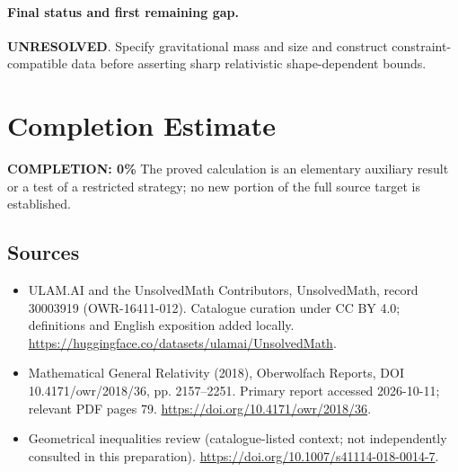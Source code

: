 \documentclass[11pt]{article}
\begin{document}
\paragraph{Final status and first remaining gap.}
\textbf{UNRESOLVED}. Specify gravitational mass and size and construct constraint-compatible data before asserting sharp relativistic shape-dependent bounds.

\section{Completion Estimate}
\noindent\textbf{COMPLETION: 0\%}
The proved calculation is an elementary auxiliary result or a test of a restricted strategy; no new portion of the full source target is established.

\subsection{Sources}
\begin{itemize}
\item[\hypertarget{source:30003919:1}{S1}] ULAM.AI and the UnsolvedMath Contributors, UnsolvedMath, record 30003919 (OWR-16411-012). Catalogue curation under CC BY 4.0; definitions and English exposition added locally.
\url{https://huggingface.co/datasets/ulamai/UnsolvedMath}.
\item[\hypertarget{source:30003919:2}{S2}] Mathematical General Relativity (2018), Oberwolfach Reports, DOI 10.4171/owr/2018/36, pp. 2157--2251. Primary report accessed 2026-10-11; relevant PDF pages 79.
\url{https://doi.org/10.4171/owr/2018/36}.
\item[\hypertarget{source:30003919:3}{S3}] Geometrical inequalities review (catalogue-listed context; not independently consulted in this preparation).
\url{https://doi.org/10.1007/s41114-018-0014-7}.
\end{itemize}
\label{end:30003919}
\end{document}
